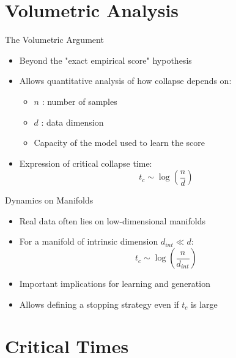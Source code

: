 \documentclass[aspectratio=169]{beamer}
\begin{document}
\section{Volumetric Analysis}

\begin{frame}{The Volumetric Argument}
    \begin{itemize}
        \item Beyond the "exact empirical score" hypothesis
        \item Allows quantitative analysis of how collapse depends on:
        \begin{itemize}
            \item $n$ : number of samples
            \item $d$ : data dimension
            \item Capacity of the model used to learn the score
        \end{itemize}
        \item Expression of critical collapse time:
        \begin{equation}
            t_c \sim \log\left(\frac{n}{d}\right)
        \end{equation}
    \end{itemize}
\end{frame}

\begin{frame}{Dynamics on Manifolds}
    \begin{itemize}
        \item Real data often lies on low-dimensional manifolds
        \item For a manifold of intrinsic dimension $d_{int} \ll d$:
        \begin{equation}
            t_c \sim \log\left(\frac{n}{d_{int}}\right)
        \end{equation}
        \item Important implications for learning and generation
        \item Allows defining a stopping strategy even if $t_c$ is large
    \end{itemize}
\end{frame}

\section{Critical Times}
\end{document}
